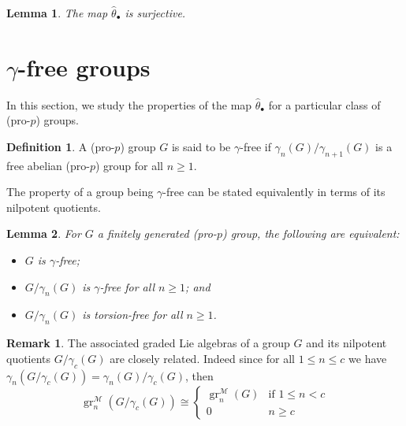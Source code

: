 \documentclass{amsart}
\theoremstyle{plain}
\newtheorem{lem}{Lemma}
\theoremstyle{definition}
\newtheorem{defn}{Definition}
\newtheorem{remark}{Remark}
\numberwithin{theorem}{section}
\numberwithin{equation}{section}
\newcommand{\grM}{\operatorname{gr}^{\mathscr M}}
\begin{document}
\begin{lem}\label{lem:hat.theta.epi}
	The map $\hat \theta_\bullet$ is surjective.
\end{lem}

\section{$\gamma$-free groups}
In this section, we study the properties of the map $\hat\theta_\bullet$ for a particular class of (pro-$p$) groups.

\begin{defn}
    A (pro-$p$) group $G$ is said to be $\gamma$-free if $\gamma_n(G)/\gamma_{n+1}(G)$ is a free abelian (pro-$p$) group for all $n \geq 1$.
\end{defn}

The property of a group being $\gamma$-free can be stated equivalently in terms of its nilpotent quotients.

\begin{lem}\label{lem:gamma.free.equiv}
    For $G$ a finitely generated (pro-$p$) group, the following are equivalent:
    \begin{itemize}
        \item[(i)] $G$ is $\gamma$-free;
        \item[(ii)] $G/\gamma_n(G)$ is $\gamma$-free for all $n \geq 1$; and
        \item[(iii)] $G/\gamma_n(G)$ is torsion-free for all $n \geq 1$. 
    \end{itemize}
\end{lem}

\begin{remark}\label{rem:nilpotent.quotients}
	The associated graded Lie algebras of a group $G$ and its nilpotent quotients $G/\gamma_c(G)$ are closely related. Indeed since for all $1 \leq n \leq c$ we have $\gamma_n(G/\gamma_c(G)) = \gamma_n(G)/\gamma_c(G)$, then 
\[
	\grM_n(G/\gamma_c(G)) \cong \begin{cases}
		\grM_n(G) & \text{if $1 \leq n < c$}\\
		0 & n \geq c
\end{cases}
\]

\end{remark}
\end{document}

